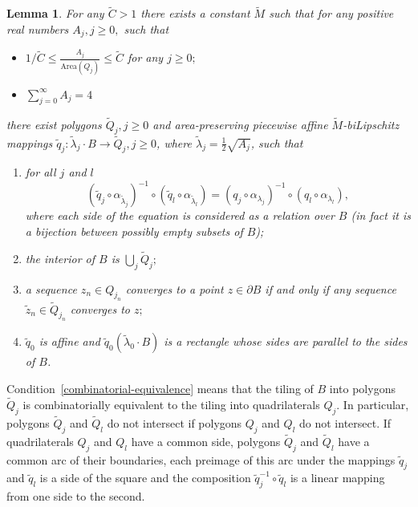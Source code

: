 \documentclass[12pt]{article}
\newtheorem{lemm}[prop]{Lemma}
\theoremstyle{definition}
\begin{document}
\begin{lemm}
\label{half-theorem}
For any $\widetilde C>1$ there exists a constant $\widetilde M$ such that for any positive real numbers $A_j, j\ge 0,$ such that
\begin{itemize}
\item $1/\widetilde C\le \frac{A_j}{\mathrm{Area}(Q_j)}\le \widetilde C$ for any $j\ge0;$
\item $\sum\limits_{j=0}^{\infty}A_j = 4$
\end{itemize}
there exist polygons $\widetilde Q_j, j\ge0$ and area-preserving piecewise affine $\widetilde M$-biLipschitz mappings $\widetilde q_{j}:\widetilde\lambda_{j}\cdot B \to\widetilde Q_j, j\ge 0$, where $\widetilde\lambda_{j} = \frac12\sqrt{A_j}$, such that
\begin{enumerate}[label = \arabic*), ref = \arabic*)]
\item
\label{combinatorial-equivalence}
for all $j$ and $l$
$$\left(\widetilde q_{j}\circ\alpha_{\widetilde\lambda_{j}}\right)^{-1}\circ\left(\widetilde q_{l}\circ\alpha_{\widetilde\lambda_{l}}\right)
=
\left(q_{j}\circ\alpha_{\lambda_{j}}\right)^{-1}\circ\left(q_{l}\circ\alpha_{\lambda_{l}}\right),$$
where each side of the equation is considered as a relation over $B$ (in fact it is a bijection between possibly empty subsets of $B$);
\item
\label{interior-cover}
the interior of $B$ is $\bigcup\limits_j \widetilde Q_j;$
\item
\label{boundary-limit}
a sequence $z_n \in Q_{j_n}$ converges to a point $z\in \partial B$ if and only if any sequence $\widetilde z_n \in \widetilde Q_{j_n}$ converges to $z;$
\item
$\widetilde q_0$ is affine and $\widetilde q_0\left(\widetilde\lambda_0\cdot B\right)$ is a rectangle whose sides are parallel to the sides of $B$.
\end{enumerate}
\end{lemm}

Condition~\ref{combinatorial-equivalence} means that the tiling of $B$ into polygons $\widetilde Q_{j}$  is combinatorially equivalent to the tiling into quadrilaterals $Q_{j}.$ In particular, polygons $\widetilde Q_j$ and $\widetilde Q_l$ do not intersect if polygons $Q_j$ and $Q_l$ do not intersect. If quadrilaterals $Q_j$ and $Q_l$ have a common side, polygons $\widetilde Q_j$ and $\widetilde Q_l$ have a common arc of their boundaries, each preimage of this arc under the mappings $\widetilde q_{j}$ and $\widetilde q_{l}$ is a side of the square and the composition $\widetilde q_{j}^{-1}\circ \widetilde q_{l}$ is a linear mapping from one side to the second.
\end{document}
